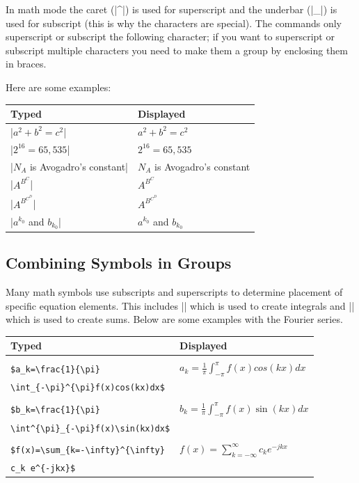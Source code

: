 In math mode the caret (|^|) is used for superscript and the underbar (|_|) is
used for subscript (this is why the characters are special). The commands only
superscript or subscript the following character; if you want to superscript or
subscript multiple characters you need to make them a group by enclosing them
in braces.

Here are some examples:

\begin{center}
\begin{tabular}{l|l}
Typed                   & Displayed\\\hline
|$a^2+b^2=c^2$|         & $a^2+b^2=c^2$\\
|$2^{16}=65,535$|       & $2^{16}=65,535$\\
|$N_A$ is Avogadro's constant| & $N_A$ is Avogadro's constant \\
|$A^{B^C}$|             & $A^{B^C}$\\
|$A^{B^{C^D}}$|         & $A^{B^{C^D}}$\\
|$a^{k_0}$ and $b_{k_0}$|  & $a^{k_0}$ and $b_{k_0}$ \\
\end{tabular}
\end{center}

\subsection{Combining Symbols in Groups}

Many math symbols use subscripts and superscripts to determine placement of
specific equation elements.  This includes |\int| which is used to create
integrals and |\sum| which is used to create sums. Below are some examples with
the Fourier series.

\begin{center}
\begin{tabular}{l|l}
Typed                   & Displayed\\\hline
\\
\verb|$a_k=\frac{1}{\pi}|                  & $a_k = \frac{1}{\pi}\int_{-\pi}^{\pi}f(x)cos(kx)dx$\\
\verb|\int_{-\pi}^{\pi}f(x)cos(kx)dx$|      & \\[4pt]
\hline
\\
\verb|$b_k=\frac{1}{\pi}|                  & $b_k = \frac{1}{\pi}\int^{\pi}_{-\pi}f(x)\sin(kx)dx$\\
\verb|\int^{\pi}_{-\pi}f(x)\sin(kx)dx$|      & \\[4pt]
\hline
\\
\verb|$f(x)=\sum_{k=-\infty}^{\infty}| & $f(x)=\sum_{k=-\infty}^{\infty}c_k e^{-jkx}$\\
\verb|c_k e^{-jkx}$|                 & \\[4pt]
\end{tabular}
\end{center}

